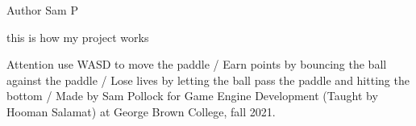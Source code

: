 \begin{DoxyAuthor}{Author}
Sam P
\end{DoxyAuthor}
this is how my project works \begin{DoxyAttention}{Attention}
use WASD to move the paddle / Earn points by bouncing the ball against the paddle / Lose lives by letting the ball pass the paddle and hitting the bottom / Made by Sam Pollock for Game Engine Development (Taught by Hooman Salamat) at George Brown College, fall 2021. 
\end{DoxyAttention}
